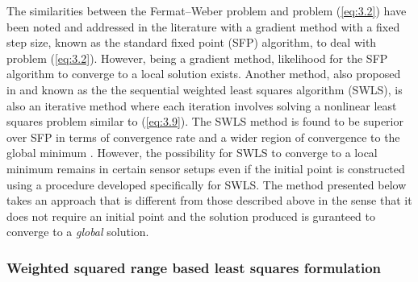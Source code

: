 The similarities between the Fermat--Weber problem and problem (\ref{eq:3.2}) have been noted and addressed in the literature \cite{BeckTeCh} with a gradient method with a fixed step size, known as the standard fixed point (SFP) algorithm, to deal with problem (\ref{eq:3.2}). However, being a gradient method, likelihood for the SFP algorithm to converge to a local solution exists. Another method, also proposed in \cite{BeckTeCh} and known  as the the sequential weighted least squares algorithm (SWLS), is also an iterative method where each iteration involves solving a nonlinear least squares problem similar to (\ref{eq:3.9}). The SWLS method is found to be superior over SFP in terms of convergence rate and a wider region of convergence to the global minimum \cite{BeckTeCh}. However, the possibility for SWLS to converge to a local minimum remains in certain sensor setups even if the initial point is constructed using a procedure developed specifically for SWLS. The method presented below takes an approach that is different from those described above in the sense that it does not require an initial point and the solution produced is guranteed to converge to a \textit{global} solution. 

\subsubsection{Weighted squared range based least squares formulation} %

